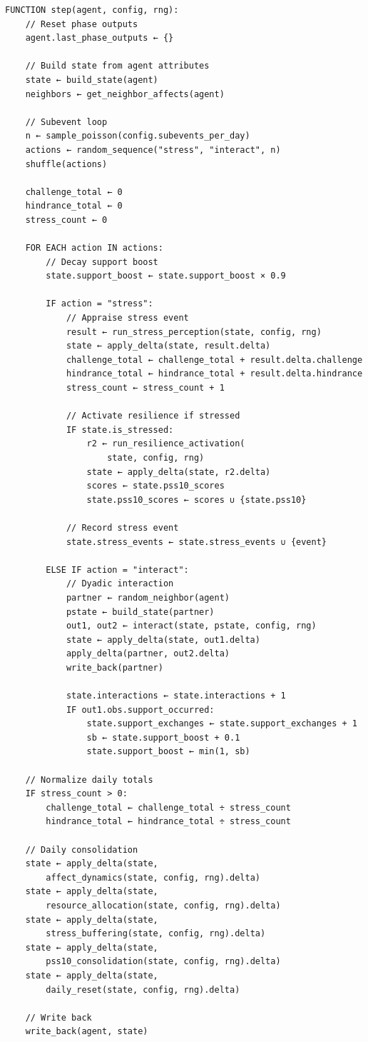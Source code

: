 \documentclass[
  letterpaper,
  DIV=11,
  numbers=noendperiod]{scrartcl}
\begin{document}
\begin{verbatim}
FUNCTION step(agent, config, rng):
    // Reset phase outputs
    agent.last_phase_outputs ← {}

    // Build state from agent attributes
    state ← build_state(agent)
    neighbors ← get_neighbor_affects(agent)

    // Subevent loop
    n ← sample_poisson(config.subevents_per_day)
    actions ← random_sequence("stress", "interact", n)
    shuffle(actions)

    challenge_total ← 0
    hindrance_total ← 0
    stress_count ← 0

    FOR EACH action IN actions:
        // Decay support boost
        state.support_boost ← state.support_boost × 0.9

        IF action = "stress":
            // Appraise stress event
            result ← run_stress_perception(state, config, rng)
            state ← apply_delta(state, result.delta)
            challenge_total ← challenge_total + result.delta.challenge
            hindrance_total ← hindrance_total + result.delta.hindrance
            stress_count ← stress_count + 1

            // Activate resilience if stressed
            IF state.is_stressed:
                r2 ← run_resilience_activation(
                    state, config, rng)
                state ← apply_delta(state, r2.delta)
                scores ← state.pss10_scores
                state.pss10_scores ← scores ∪ {state.pss10}

            // Record stress event
            state.stress_events ← state.stress_events ∪ {event}

        ELSE IF action = "interact":
            // Dyadic interaction
            partner ← random_neighbor(agent)
            pstate ← build_state(partner)
            out1, out2 ← interact(state, pstate, config, rng)
            state ← apply_delta(state, out1.delta)
            apply_delta(partner, out2.delta)
            write_back(partner)

            state.interactions ← state.interactions + 1
            IF out1.obs.support_occurred:
                state.support_exchanges ← state.support_exchanges + 1
                sb ← state.support_boost + 0.1
                state.support_boost ← min(1, sb)

    // Normalize daily totals
    IF stress_count > 0:
        challenge_total ← challenge_total ÷ stress_count
        hindrance_total ← hindrance_total ÷ stress_count

    // Daily consolidation
    state ← apply_delta(state,
        affect_dynamics(state, config, rng).delta)
    state ← apply_delta(state,
        resource_allocation(state, config, rng).delta)
    state ← apply_delta(state,
        stress_buffering(state, config, rng).delta)
    state ← apply_delta(state,
        pss10_consolidation(state, config, rng).delta)
    state ← apply_delta(state,
        daily_reset(state, config, rng).delta)

    // Write back
    write_back(agent, state)
\end{verbatim}
\end{document}
